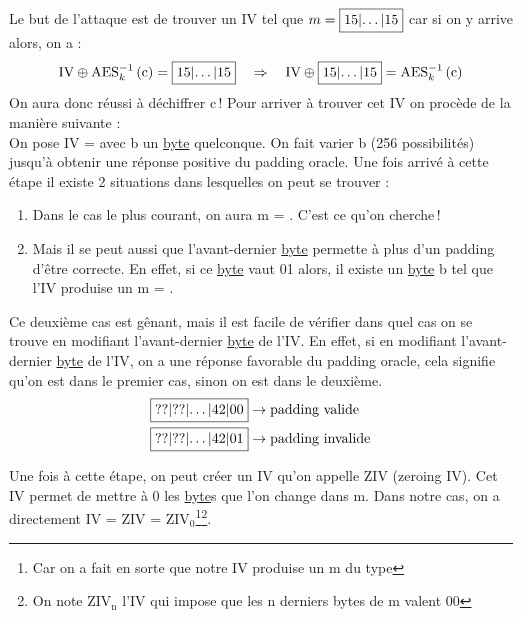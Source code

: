 \documentclass[a4paper, 12pt]{article}
\begin{document}
\label{demodinpaddingracle}Le but de l'attaque est de trouver un IV tel que $m = \fbox{15|\dots|15}$ car si on y arrive alors, on a : 
$$ 
\text{IV} \oplus \text{AES}^{-1}_{k}\left(\text{c}\right) = \fbox{15|\dots|15} \quad \Rightarrow \quad \text{IV} \oplus \fbox{15|\dots|15} = \text{AES}^{-1}_{k}\left(\text{c}\right)
$$
On aura donc réussi à déchiffrer c ! Pour arriver à trouver cet IV on procède de la manière suivante : \\

On pose IV =  avec b un \hyperref[byte]{byte} quelconque. On fait varier b (256 possibilités) jusqu'à obtenir une réponse positive du padding oracle. Une fois arrivé à cette étape il existe 2 situations dans lesquelles on peut se trouver :

\begin{enumerate}
	\item Dans le cas le plus courant, on aura m = . C'est ce qu'on cherche !
	\item Mais il se peut aussi que l'avant-dernier \hyperref[byte]{byte} permette à plus d'un padding d'être correcte. En effet, si ce \hyperref[byte]{byte} vaut 01 alors, il existe un \hyperref[byte]{byte} b tel que l'IV produise un m = .
\end{enumerate}
Ce deuxième cas est gênant, mais il est facile de vérifier dans quel cas on se trouve en modifiant l'avant-dernier \hyperref[byte]{byte} de l'IV.
En effet, si en modifiant l'avant-dernier \hyperref[byte]{byte} de l'IV, on a une réponse favorable du padding oracle, cela signifie qu'on est dans le premier cas, sinon on est dans le deuxième. 
\begin{align*}
	&\fbox{??|??|$\dots$|42|00} \rightarrow \text{padding valide}\\
	&\fbox{??|??|$\dots$|42|01} \rightarrow \text{padding invalide}
\end{align*}

Une fois à cette étape, on peut créer un IV qu'on appelle ZIV (zeroing IV). Cet IV permet de mettre à 0 les \hyperref[byte]{byte}s que l'on change dans m. Dans notre cas, on a directement IV = ZIV = $\text{ZIV}_{0}$\footnote{Car on a fait en sorte que notre IV produise un m du type }\footnote{On note $\text{ZIV}_{\text{n}}$ l'IV qui impose que les n derniers bytes de m valent 00}. \\
\end{document}
